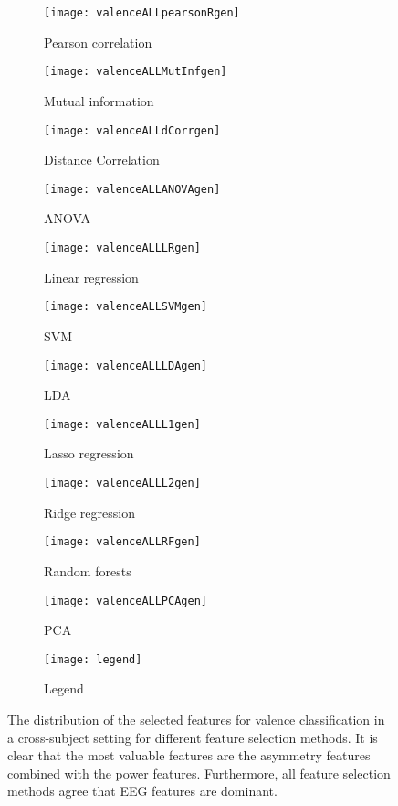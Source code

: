 \begin{figure}[!tbp]
  \centering
  \begin{subfigure}[b]{0.3\textwidth}
    \texttt{[image: valenceALLpearsonRgen]}
    \caption{Pearson correlation}
  \end{subfigure}
  \hfill
  \begin{subfigure}[b]{0.3\textwidth}
    \texttt{[image: valenceALLMutInfgen]}
    \caption{Mutual information}
  \end{subfigure}
  \hfill
  \begin{subfigure}[b]{0.3\textwidth}
    \texttt{[image: valenceALLdCorrgen]}
    \caption{Distance Correlation}
  \end{subfigure}
  
  \begin{subfigure}[b]{0.3\textwidth}
    \texttt{[image: valenceALLANOVAgen]}
    \caption{ANOVA}
  \end{subfigure}
  \hfill
  \begin{subfigure}[b]{0.3\textwidth}
    \texttt{[image: valenceALLLRgen]}
    \caption{Linear regression}
  \end{subfigure}
  \hfill
  \begin{subfigure}[b]{0.3\textwidth}
    \texttt{[image: valenceALLSVMgen]}
    \caption{SVM}
  \end{subfigure}
  
  \begin{subfigure}[b]{0.3\textwidth}
    \texttt{[image: valenceALLLDAgen]}
    \caption{LDA}
  \end{subfigure}
  \hfill
  \begin{subfigure}[b]{0.3\textwidth}
    \texttt{[image: valenceALLL1gen]}
    \caption{Lasso regression}
  \end{subfigure}
  \hfill
  \begin{subfigure}[b]{0.3\textwidth}
    \texttt{[image: valenceALLL2gen]}
    \caption{Ridge regression}
  \end{subfigure}
  
  \begin{subfigure}[b]{0.3\textwidth}
    \texttt{[image: valenceALLRFgen]}
    \caption{Random forests}
  \end{subfigure}
  \hfill
  \begin{subfigure}[b]{0.3\textwidth}
    \texttt{[image: valenceALLPCAgen]}
    \caption{PCA}
  \end{subfigure}
  \hfill
  \begin{subfigure}[b]{0.3\textwidth}
    \texttt{[image: legend]}
    \caption{Legend\label{valencepieslegendgen}}
  \end{subfigure}
    \caption{The distribution of the selected features for valence classification in a cross-subject setting for different feature selection methods. It is clear that the most valuable features are the asymmetry features combined with the power features. Furthermore, all feature selection methods agree that EEG features are dominant.\label{valencepiesgen}}
\end{figure}
